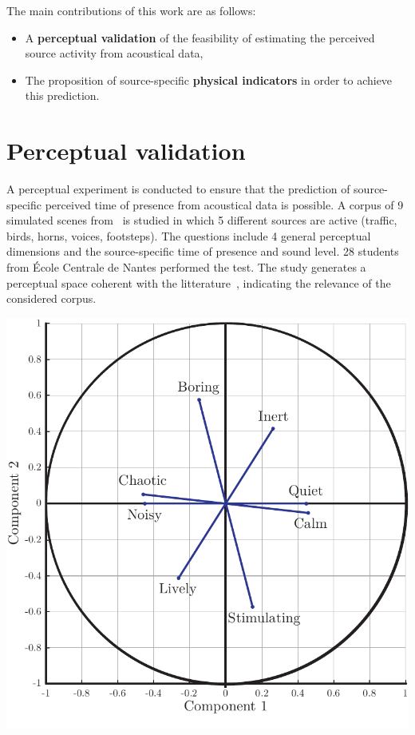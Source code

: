 \documentclass[a0,portrait]{a0poster}
\begin{document}
\begin{multicols}{2}
The main contributions of this work are as follows:
\begin{itemize}
\item A \textbf{perceptual validation} of the feasibility of estimating the perceived source activity from acoustical data,
\item The proposition of source-specific \textbf{physical indicators} in order to achieve this prediction.
\end{itemize}

\section*{Perceptual validation}
 \begin{minipage}[c]{.48\linewidth}
A perceptual experiment is conducted to ensure that the prediction of source-specific perceived time of presence from acoustical data is possible. A corpus of 9 simulated scenes from~\cite{gloaguen2017} is studied in which 5 different sources are active (traffic, birds, horns, voices, footsteps). The questions include 4 general perceptual dimensions and the source-specific time of presence and sound level. 28 students from \'Ecole Centrale de Nantes performed the test. The study generates a perceptual space coherent with the litterature~\cite{axelsson2010}, indicating the relevance of the considered corpus.
\end{minipage}
\hfill
 \begin{minipage}[c]{.48\linewidth}
\begin{center}\vspace{1cm}
\includegraphics[width=.8\linewidth]{pca.pdf}
\end{center}
\end{minipage}
\vspace{1cm}


\end{multicols}
\end{document}
